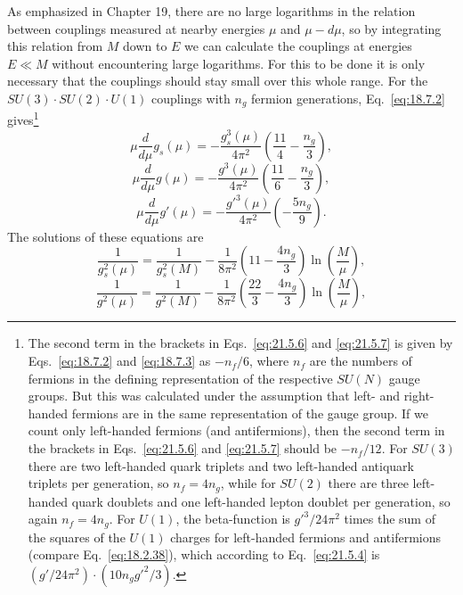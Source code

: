 As emphasized in Chapter 19, there are no large logarithms in the relation between couplings measured at nearby energies $\mu$ and $\mu-d\mu$, so by integrating this relation from $M$ down to $E$ we can calculate the couplings at energies $E\ll M$ without encountering large logarithms. For this to be done it is only necessary that the couplings should stay small over this whole range. For the $SU(3)\cdot SU(2)\cdot U(1)$ couplings with $n_g$ fermion generations, Eq.~\eqref{eq:18.7.2} gives\footnote{The second term in the brackets in Eqs.~\eqref{eq:21.5.6} and \eqref{eq:21.5.7} is given by Eqs.~\eqref{eq:18.7.2} and \eqref{eq:18.7.3} as $-n_f/6$, where $n_f$ are the numbers of fermions in the defining representation of the respective $SU(N)$ gauge groups. But this was calculated under the assumption that left- and right-handed fermions are in the same representation of the gauge group. If we count only left-handed fermions (and antifermions), then the second term in the brackets in Eqs.~\eqref{eq:21.5.6} and \eqref{eq:21.5.7} should be $-n_f/12$. For $SU(3)$ there are two left-handed quark triplets and two left-handed antiquark triplets per generation, so $n_f=4n_g$, while for $SU(2)$ there are three left-handed quark doublets and one left-handed lepton doublet per generation, so again $n_f=4n_g$. For $U(1)$, the beta-function is $g'^3/24\pi^2$ times the sum of the squares of the $U(1)$ charges for left-handed fermions and antifermions (compare Eq.~\eqref{eq:18.2.38}), which according to Eq.~\eqref{eq:21.5.4} is $(g'/24\pi^2)\cdot(10n_gg'^2/3)$.}
\begin{equation}
\mu\frac{d}{d\mu}g_s(\mu)
=-\frac{g_s^3(\mu)}{4\pi^2}
\left(\frac{11}{4}-\frac{n_g}{3}\right),
\tag{21.5.6}\label{eq:21.5.6}
\end{equation}
\begin{equation}
\mu\frac{d}{d\mu}g(\mu)
=-\frac{g^3(\mu)}{4\pi^2}
\left(\frac{11}{6}-\frac{n_g}{3}\right),
\tag{21.5.7}\label{eq:21.5.7}
\end{equation}
\begin{equation}
\mu\frac{d}{d\mu}g'(\mu)
=-\frac{g'^3(\mu)}{4\pi^2}
\left(-\frac{5n_g}{9}\right).
\tag{21.5.8}\label{eq:21.5.8}
\end{equation}
The solutions of these equations are
\begin{equation}
\frac{1}{g_s^2(\mu)}
=\frac{1}{g_s^2(M)}
-\frac{1}{8\pi^2}
\left(11-\frac{4n_g}{3}\right)
\ln\left(\frac{M}{\mu}\right),
\tag{21.5.9}\label{eq:21.5.9}
\end{equation}
\begin{equation}
\frac{1}{g^2(\mu)}
=\frac{1}{g^2(M)}
-\frac{1}{8\pi^2}
\left(\frac{22}{3}-\frac{4n_g}{3}\right)
\ln\left(\frac{M}{\mu}\right),
\tag{21.5.10}\label{eq:21.5.10}
\end{equation}
